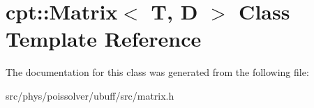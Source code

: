 \hypertarget{classcpt_1_1Matrix}{}\section{cpt\+:\+:Matrix$<$ T, D $>$ Class Template Reference}
\label{classcpt_1_1Matrix}


The documentation for this class was generated from the following file\+:\begin{DoxyCompactItemize}
\item 
src/phys/poissolver/ubuff/src/matrix.\+h\end{DoxyCompactItemize}
